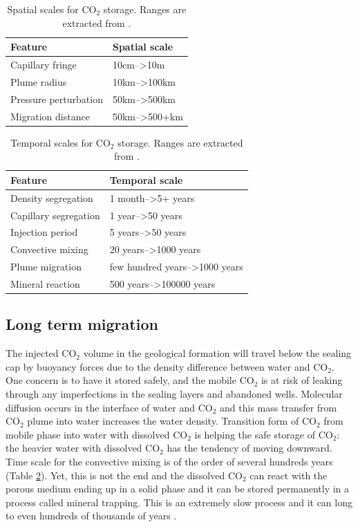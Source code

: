 \begin{table}[tbf]
  \center
  \caption{Spatial scales for $\mbox{CO}_2$ storage. Ranges are extracted from
  \cite{celia2011geological}.}
  \begin{tabular}{ |l|| l| }
    \hline
    Feature& Spatial scale \\
    \hline
    Capillary fringe & 10cm-->10m\\
    \hline
    Plume radius & 10km-->100km\\
    \hline
    Pressure perturbation & 50km-->500km\\
    \hline
    Migration distance & 50km-->500+km\\
    \hline
  \end{tabular}
  \label{tab:xscl}
\end{table}

\begin{table}
\center
  \caption{Temporal scales for $\mbox{CO}_2$ storage. Ranges are extracted from
\cite{celia2011geological,gunter1997aquifer}.}
\begin{tabular}{ |l|| l| }
    \hline
    Feature& Temporal scale \\
    \hline
    Density segregation & 1 month-->5+ years\\
    \hline
    Capillary segregation & 1 year-->50 years\\
    \hline
    Injection period & 5 years-->50 years\\
    \hline
    Convective mixing & 20 years-->1000 years\\
    \hline
    Plume migration & few hundred years-->1000 years\\
    \hline
    Mineral reaction & 500 years-->100000 years \\
    \hline
  \end{tabular}
  \label{tab:tscl}
\end{table}

\subsection{Long term migration}

The injected $\mbox{CO}_2$ volume in the geological formation will travel below
the sealing cap by buoyancy forces due to the density difference between water
and $\mbox{CO}_2$. One concern is to have it stored safely, and the mobile
$\mbox{CO}_2$ is at risk of leaking through any imperfections in the sealing
layers and abandoned wells. Molecular diffusion occurs in the interface of water
and $\mbox{CO}_2$ and this mass transfer from $\mbox{CO}_2$ plume into water
increases the water density. Transition form of $\mbox{CO}_2$ from mobile phase
into water with dissolved $\mbox{CO}_2$ is helping the safe storage of
$\mbox{CO}_2$: the heavier water with dissolved $\mbox{CO}_2$ has the tendency
of moving downward. Time scale for the convective mixing is of the order of
several hundreds years (Table \ref{tab:tscl}). Yet, this is not the end and   the
dissolved $\mbox{CO}_2$ can react with the porous medium ending up in a solid
phase and it can be stored permanently in a process called mineral trapping.
This is an 
extremely slow process and it can long to even hundreds of thousands of years
\cite{gunter1997aquifer}.

